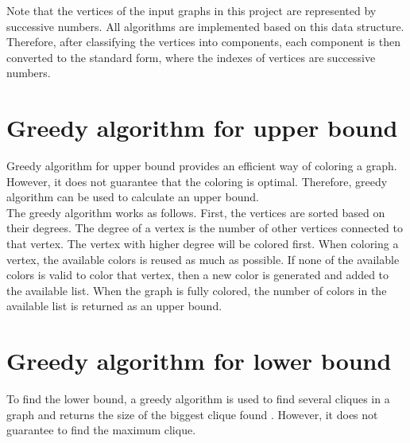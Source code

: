 \documentclass[a4paper]{report}
\begin{document}
		Note that the vertices of the input graphs in this project are represented by successive numbers. All algorithms are implemented based on this data structure. Therefore, after classifying the vertices into components, each component is then converted to the standard form, where the indexes of vertices are successive numbers.
		
		\section{Greedy algorithm for upper bound}
		Greedy algorithm for upper bound \cite{jensen2011graph} provides an efficient way of coloring a graph. However, it does not guarantee that the coloring is optimal. Therefore, greedy algorithm can be used to calculate an upper bound.\\
		
		The greedy algorithm works as follows. First, the vertices are sorted based on their degrees. The degree of a vertex is the number of other vertices connected to that vertex. The vertex with higher degree will be colored first. When coloring a vertex, the available colors is reused as much as possible. If none of the available colors is valid to color that vertex, then a new color is generated and added to the available list. When the graph is fully colored, the number of colors in the available list is returned as an upper bound.\\
		
		\section{Greedy algorithm for lower bound}
		To find the lower bound, a greedy algorithm is used to find several cliques in a graph and returns the size of the biggest clique found \cite{steven2008algorithm}. However, it does not guarantee to find the maximum clique. \\
		
\end{document}
